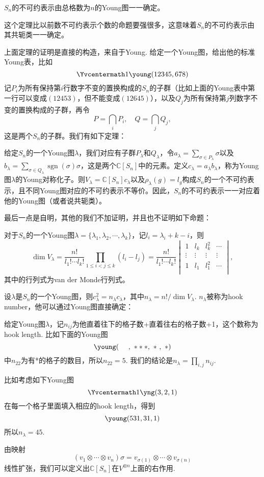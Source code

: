 \documentclass[10pt]{article}
\newcommand{\cc}{\mathbb{C}}
\DeclareMathOperator{\sgn}{sgn}
\begin{document}
\theo $S_n$的不可约表示由总格数为$n$的Young图一一确定。

这个定理比以前数不可约表示个数的命题要强很多，这意味着$S_n$的不可约表示由其共轭类一一确定。

\para 上面定理的证明是直接的构造，来自于Young. 给定一个Young图，给出他的标准Young表，比如
\[\Yvcentermath1
	\young(12345,678)
\]
记$P_i$为所有保持第$i$行数字不变的置换构成的$S_n$的子群（比如上面的Young表中第一行可以变成$(12453)$，但不能变成$(12645)$），以及$Q_j$为所有保持第$j$列数字不变的置换构成的子群，再令
\[
	P=\bigcap_i P_i,\quad Q=\bigcap_j Q_j,
\]
这是两个$S_n$的子群。我们有如下定理：

\theo 给定$S_n$的一个Young图$\lambda$，我们对应有子群$P_\lambda$和$Q_\lambda$，令$a_\lambda=\sum_{\sigma\in P_\lambda}\sigma$以及$b_\lambda=\sum_{\sigma\in Q_\lambda}\sgn(\sigma)\sigma$，这是两个$\cc[S_n]$中的元素。定义$c_\lambda=a_\lambda b_\lambda$，称为Young图$\lambda$的Young对称化子。则$V_\lambda=\cc[S_n]c_\lambda$以及$\rho_\lambda(g)=l_g$构成$S_n$的一个不可约表示，且不同Young图对应的不可约表示不等价。因此，$S_n$的不可约表示一一对应着他的Young图（或者说共轭类）。

最后一点是自明，其他的我们不加证明，并且也不证明如下命题：

\pro 对于$S_n$的一个Young图$\lambda=\{\lambda_1,\lambda_2,\cdots,\lambda_k\}$，记$l_i=\lambda_i+k-i$，则
\[
	\dim V_\lambda=\frac{n!}{l_1!\cdots l_k!}\prod_{1\leq i< j\leq k}(l_i-l_j)=\frac{n!}{l_1!\cdots l_k!}\begin{vmatrix}
	1& l_k & l_k^2&\cdots\\
	\vdots&\vdots&\vdots&\vdots\\
	1& l_1 & l_1^2&\cdots\\
	\end{vmatrix},
\]
其中的行列式为van der Monde行列式。

\pro 设$\lambda$是$S_n$的一个Young图，则$c_\lambda^2=n_\lambda c_\lambda$，其中$n_\lambda=n!/\dim V_\lambda$. $n_\lambda$被称为hook number，他可以通过Young图直接确定：

给定Young图$\lambda$，记$n_{ij}$为他直着往下的格子数+直着往右的格子数+1，这个数称为hook length. 比如下面的Young图
\[
	\young(~~~~,~***,~*~,~*)
\]
中$n_{22}$为有*的格子的数目，所以$n_{22}=5$. 我们的结论是$n_\lambda=\prod_{i,j}n_{ij}$.

比如考虑如下Young图\[\Yvcentermath1
	\yng(3,2,1)
\]
在每一个格子里面填入相应的hook length，得到
\[
	\young(531,31,1)
\]
所以$n_\lambda= 45$.

\para 由映射
\[
	(v_{1}\otimes\cdots\otimes v_{n})\sigma=v_{{\sigma(1)}}\otimes\cdots\otimes v_{{\sigma(n)}}
\]
线性扩张，我们可以定义出$\cc[S_n]$在$V^{\otimes n}$上面的右作用.
\end{document}
